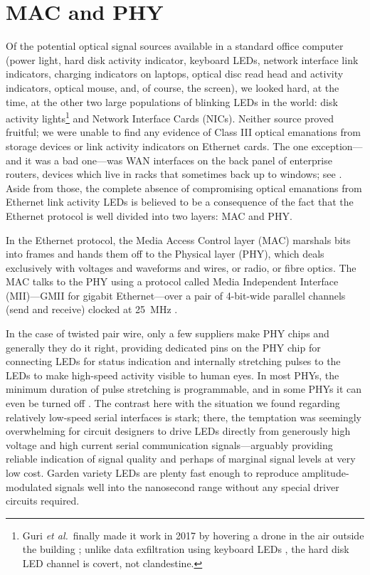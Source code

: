 \documentclass[conference]{IEEEtran}
\begin{document}
\section{MAC and PHY}

Of the potential optical signal sources available in a standard office
computer (power light, hard disk activity indicator, keyboard LEDs, network
interface link indicators, charging indicators on laptops, optical disc read
head and activity indicators, optical mouse, and, of course, the screen), we
looked hard, at the time, at the other two large populations of blinking
LEDs in the world: disk activity lights\footnote{Guri {\it et al.}\ finally
made it work in 2017 by hovering a drone in the air outside the building
\cite{Guri2017a}; unlike data exfiltration using keyboard LEDs
\cite[Chapter 90]{Stephenson1999}, the hard disk LED channel is covert, not
clandestine.} and Network Interface Cards (NICs).
Neither source proved fruitful; we were unable to find any evidence of Class
III optical emanations from storage devices or link activity indicators on
Ethernet cards. The one exception---and it was a bad one---was WAN interfaces
on the back panel of enterprise routers, devices which live in racks that
sometimes back up to windows; see \cite[\S 4.3.1]{Loughry2002a}. Aside from
those, the complete absence of compromising optical emanations from Ethernet
link activity LEDs is believed to be a consequence of the fact that the
Ethernet protocol is well divided into two layers: MAC and PHY.

In the Ethernet protocol, the Media Access Control layer (MAC) marshals bits
into frames and hands them off to the Physical layer (PHY), which deals
exclusively with voltages and waveforms and wires, or radio, or fibre
optics. The MAC talks to the PHY using a protocol called Media Independent
Interface (MII)---GMII for gigabit Ethernet---over a pair of 4-bit-wide
parallel channels (send and receive) clocked at \SI{25}{\mega\hertz}
\cite{TI2009a}.

In the case of twisted pair wire, only a few suppliers make PHY chips and
generally they do it right, providing dedicated pins on the PHY chip for
connecting LEDs for status indication and internally stretching pulses to the
LEDs to make high-speed activity visible to human eyes. In most PHYs, the
minimum duration of pulse stretching is programmable, and in some PHYs it can
even be turned off \cite[Table 39]{Intel2011a}. The contrast here with the
situation we found regarding relatively low-speed serial interfaces is stark;
there, the temptation was seemingly overwhelming for circuit designers to
drive LEDs directly from generously high voltage and high current serial
communication signals---arguably providing reliable indication of signal
quality and perhaps of marginal signal levels at very low cost. Garden
variety LEDs are plenty fast enough to reproduce amplitude-modulated signals
well into the nanosecond range without any special driver circuits required.
\end{document}
